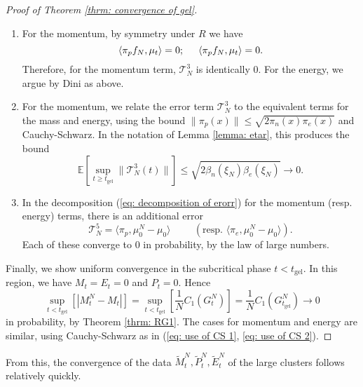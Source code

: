 \begin{proof}[Proof of Theorem \ref{thrm: convergence of gel}]
\begin{enumerate}[label=\roman{*}).]
       \item For the momentum, by symmetry under $R$ we have \begin{equation}
           \langle \pi_p f_N, \mu_t\rangle =0; \hspace{0.5cm} \langle \pi_p f_N, \mu_t\rangle =0.
       \end{equation} Therefore, for the momentum term, $\mathcal{T}^3_N$ is identically $0$. For the energy, we argue by Dini as above.
       \item For the momentum, we relate the error term $\mathcal{T}^3_N$ to the equivalent terms for the mass and energy, using the bound $\|\pi_p(x)\|\le\sqrt{2\pi_n(x)\pi_e(x)}$ and Cauchy-Schwarz. In the notation of Lemma \ref{lemma: etar}, this produces the bound \begin{equation}
           \mathbb{E}\left[\sup_{t\geq t_\text{gel}} \|\mathcal{T}^3_N(t)\|\right] \leq \sqrt{2 \beta_n(\xi_N)\beta_e(\xi_N)} \rightarrow 0.
       \end{equation}
       \item In the decomposition (\ref{eq: decomposition of erorr}) for the momentum (resp. energy) terms, there is an additional error \begin{equation}
           \mathcal{T}^5_N = \langle \pi_p, \mu^N_0-\mu_0\rangle \hspace{1cm}\left(\text{resp. } \langle \pi_e, \mu^N_0-\mu_0\rangle\right).
       \end{equation} Each of these converge to $0$ in probability, by the law of large numbers.
   \end{enumerate} \bigskip  Finally, we show uniform convergence in the subcritical phase $t<t_\text{gel}$. In this region, we have $M_t=E_t=0$ and $P_t=0$. Hence \begin{equation}
       \sup_{t<t_\text{gel}} \left[|M^N_t-M_t|\right] = \sup_{t<t_\text{gel}}\left[ \frac{1}{N}C_1(G^N_t)\right]=\frac{1}{N}C_1(G^N_{t_\text{gel}}) \rightarrow 0
   \end{equation} in probability, by Theorem \ref{thrm: RG1}. The cases for momentum and energy are similar, using Cauchy-Schwarz as in (\ref{eq: use of CS 1}, \ref{eq: use of CS 2}). \end{proof} 
   
   From this, the convergence of the data $\widetilde{M}^N_t, \widetilde{P}^N_t, \widetilde{E}^N_t$ of the large clusters follows relatively quickly.
   
